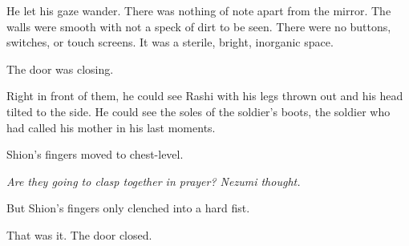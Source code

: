 He let his gaze wander. There was nothing of note apart from the mirror.
The walls were smooth with not a speck of dirt to be seen. There were no
buttons, switches, or touch screens. It was a sterile, bright, inorganic
space.

The door was closing.

Right in front of them, he could see Rashi with his legs thrown out and
his head tilted to the side. He could see the soles of the soldier's
boots, the soldier who had called his mother in his last moments.

Shion's fingers moved to chest-level.

\emph{Are they going to clasp together in prayer? Nezumi thought.}

But Shion's fingers only clenched into a hard fist.

That was it.
The door closed.